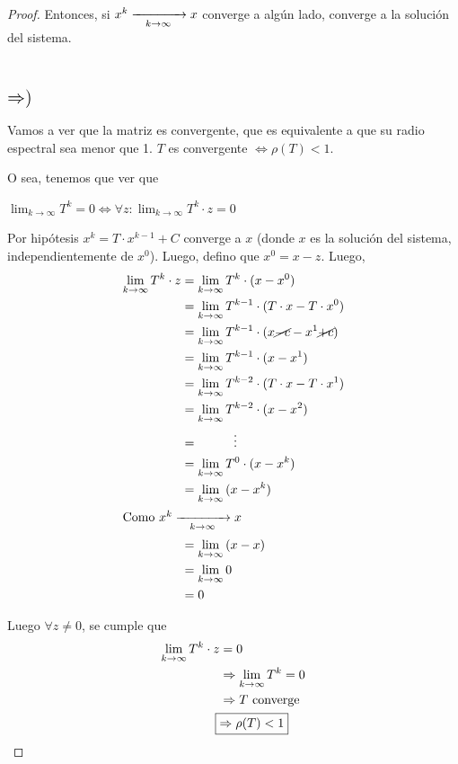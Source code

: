 \documentclass[]{article}
\begin{document}
\begin{prop}
\begin{proof}
		Entonces, si $x^k\xrightarrow[\hspace*{0.3cm} k\to\infty \hspace*{0.3cm}]{} x$ converge a algún lado, converge a la solución del sistema.

		~\newline
		~\newline

		$\mbox{\Large{$\Rightarrow)$}}$

		Vamos a ver que la matriz es convergente, que es equivalente a que su radio espectral sea menor que 1. $T$ es convergente $\Leftrightarrow \rho(T)<1$.

		O sea, tenemos que ver que

		\begin{center}
			$\displaystyle \lim_{k\to\infty}{T^k}=0 \Leftrightarrow \forall z : \lim_{k\to\infty} T^k\cdot z = 0$
		\end{center}

		Por hipótesis $x^k = T\cdot x^{k-1} + C$ converge a $x$ (donde $x$ es la solución del sistema, independientemente de $x^0$). Luego, defino que $x^0 = x-z$. Luego,
		\begin{align*}
			\displaystyle \lim_{k\to\infty}{T^k\cdot z} &= \displaystyle \lim_{k\to\infty}{T^k\cdot (x-x^0)}\\
			&= \displaystyle \lim_{k\to\infty}{T^{k-1}\cdot (T\cdot x - T\cdot x^0)}\\
			&= \displaystyle \lim_{k\to\infty}{T^{k-1}\cdot (x\cancel{-c}-x^1\cancel{+c})} \\
			&= \displaystyle \lim_{k\to\infty}{T^{k-1}\cdot (x-x^1)} \\
			&= \displaystyle \lim_{k\to\infty}{T^{k-2}\cdot (T\cdot x - T\cdot x^1)} \\
			&= \displaystyle \lim_{k\to\infty}{T^{k-2}\cdot (x-x^2)} \\
			&= \hspace{1cm} \vdots \\
			&= \displaystyle \lim_{k\to\infty}{T^0\cdot (x-x^k)} \\
			&= \displaystyle \lim_{k\to\infty}{(x-x^k)} \\
			\intertext{Como $x^k\xrightarrow[\hspace*{0.3cm} k\to\infty \hspace*{0.3cm}]{}x$}
			&= \displaystyle \lim_{k\to\infty}{(x-x)} \\
			&= \displaystyle \lim_{k\to\infty}{0} \\
			&=0
		\end{align*}

		Luego $\forall z\neq0$, se cumple que
		\begin{align*}
			\displaystyle \lim_{k\to\infty}{T^k\cdot z} &= 0 \\
			&\Rightarrow \lim_{k\to\infty}{T^k}=0 \\
			&\Rightarrow T \text{ converge} \\
			\Aboxed{&\Rightarrow \rho(T)<1}\\
		\end{align*}
	\end{proof}
\end{prop}
\end{document}
